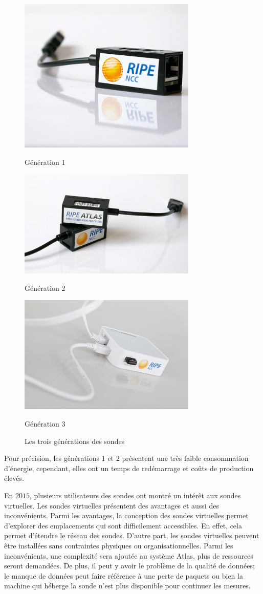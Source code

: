 \begin{figure}[H]
	
	\parbox{.32\textwidth}{\includegraphics[width=.30\textwidth, height=.20\textwidth]{illustrations/v1} 	\captionsetup{justification=centering}\caption*{Génération 1}}
	\hfill
	\parbox{.32\textwidth}{\includegraphics[width=.30\textwidth, height=.20\textwidth]{illustrations/v2}
		\captionsetup{justification=centering}
		\caption*{Génération 2}}
	\hfill
	\parbox{.32\textwidth}{\includegraphics[width=.30\textwidth,height=.20\textwidth]{illustrations/v3} 	\captionsetup{justification=centering}\caption*{Génération 3}}
	\caption{Les trois générations des sondes}
	\label{fig:genarations}
\end{figure}

Pour précision, les générations $1$ et $2$ présentent une très faible consommation d'énergie, cependant, elles ont un temps de redémarrage et coûts de production élevés. 


En $2015$, plusieurs utilisateurs des sondes ont montré un intérêt aux sondes virtuelles. Les sondes virtuelles présentent des avantages et aussi des inconvénients. Parmi les avantages, la conception des sondes virtuelles permet d'explorer des emplacements qui sont difficilement accessibles. En effet, cela permet d'étendre le réseau des sondes. D'autre part, les sondes virtuelles peuvent être installées sans contraintes physiques ou organisationnelles. Parmi les inconvénients, une complexité sera ajoutée au système  Atlas, plus de ressources seront demandées. De plus, il peut y avoir le problème de la qualité de données; le manque de données peut faire référence à une perte de paquets ou bien la machine qui héberge la sonde n'est plus disponible pour continuer les mesures. 


